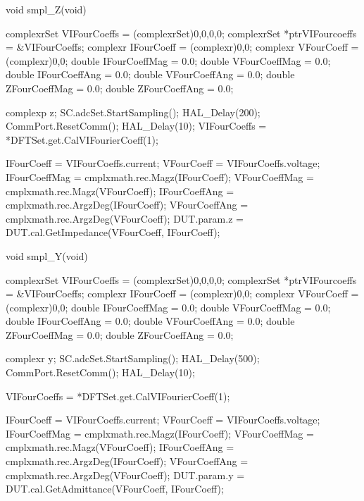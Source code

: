 void smpl_Z(void) {
	complexrSet VIFourCoeffs = (complexrSet){{0,0},{0,0}};
	complexrSet *ptrVIFourcoeffs = &VIFourCoeffs;
	complexr IFourCoeff = (complexr){0,0};
	complexr VFourCoeff = (complexr){0,0};
	double IFourCoeffMag = 0.0;
	double VFourCoeffMag = 0.0;
	double IFourCoeffAng = 0.0;
	double VFourCoeffAng = 0.0;
	double ZFourCoeffMag = 0.0;
	double ZFourCoeffAng = 0.0;

	complexp z;
	SC.adcSet.StartSampling();
	HAL_Delay(200);
	CommPort.ResetComm();
	HAL_Delay(10);
	VIFourCoeffs = *DFTSet.get.CalVIFourierCoeff(1);

	IFourCoeff = VIFourCoeffs.current;
	VFourCoeff = VIFourCoeffs.voltage;
	IFourCoeffMag = cmplxmath.rec.Magz(IFourCoeff);
	VFourCoeffMag = cmplxmath.rec.Magz(VFourCoeff);
	IFourCoeffAng = cmplxmath.rec.ArgzDeg(IFourCoeff);
	VFourCoeffAng = cmplxmath.rec.ArgzDeg(VFourCoeff);
	DUT.param.z = DUT.cal.GetImpedance(VFourCoeff, IFourCoeff);
}

void smpl_Y(void) {
	complexrSet VIFourCoeffs = (complexrSet){{0,0},{0,0}};
	complexrSet *ptrVIFourcoeffs = &VIFourCoeffs;
	complexr IFourCoeff = (complexr){0,0};
	complexr VFourCoeff = (complexr){0,0};
	double IFourCoeffMag = 0.0;
	double VFourCoeffMag = 0.0;
	double IFourCoeffAng = 0.0;
	double VFourCoeffAng = 0.0;
	double ZFourCoeffMag = 0.0;
	double ZFourCoeffAng = 0.0;

	complexr y;
	SC.adcSet.StartSampling();
	HAL_Delay(500);
	CommPort.ResetComm();
	HAL_Delay(10);


	VIFourCoeffs = *DFTSet.get.CalVIFourierCoeff(1);

	IFourCoeff = VIFourCoeffs.current;
	VFourCoeff = VIFourCoeffs.voltage;
	IFourCoeffMag = cmplxmath.rec.Magz(IFourCoeff);
	VFourCoeffMag = cmplxmath.rec.Magz(VFourCoeff);
	IFourCoeffAng = cmplxmath.rec.ArgzDeg(IFourCoeff);
	VFourCoeffAng = cmplxmath.rec.ArgzDeg(VFourCoeff);
	DUT.param.y = DUT.cal.GetAdmittance(VFourCoeff, IFourCoeff);
}

